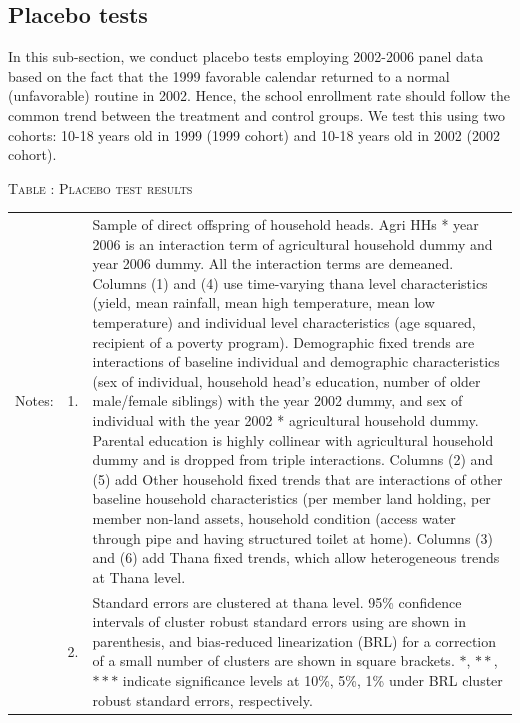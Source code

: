\documentclass[12pt,letterpaper]{article}
\newcommand{\0}{\ensuremath{\mbox{\boldmath $0$}}}
\begin{document}
\subsection{Placebo tests}

In this sub-section, we conduct placebo tests employing 2002-2006 panel data based on the fact that the 1999 favorable calendar returned to a normal (unfavorable) routine in 2002. Hence, the school enrollment rate should follow the common trend between the treatment and control groups. We test this using two cohorts: 10-18 years old in 1999 (1999 cohort) and 10-18 years old in 2002 (2002 cohort).

\begin{table}
\hfil\textsc{\footnotesize Table \thetable: Placebo test results \label{Placebo10}}\\
\setlength{\tabcolsep}{1pt}
\renewcommand{\arraystretch}{.75}
\hfil
\renewcommand{\arraystretch}{1}
\hfil\begin{tabular}{>{\hfill\scriptsize}p{1cm}<{}>{\hfill\scriptsize}p{.25cm}<{}>{\scriptsize}p{.7\paperwidth}<{\hfill}}
Notes:& 1. & Sample of direct offspring of household heads. \textsf{Agri HHs * year 2006} is an interaction term of agricultural household dummy and year 2006 dummy. All the interaction terms are demeaned. Columns \textsf{(1) and (4)} use time-varying thana level characteristics (yield, mean rainfall, mean high temperature, mean low temperature) and individual level characteristics (age squared, recipient of a poverty program). \textsf{Demographic fixed trends} are interactions of baseline individual and demographic characteristics (sex of individual, household head's education, number of older male/female siblings) with the year 2002 dummy, and sex of individual with the year 2002 * agricultural household dummy. Parental education is highly collinear with agricultural household dummy and is dropped from triple interactions. Columns \textsf{(2) and (5)} add \textsf{Other household fixed trends} that are interactions of other baseline household characteristics (per member land holding, per member non-land assets, household condition (access water through pipe and having structured toilet at home). Columns \textsf{(3) and (6)} add \textsf{Thana fixed trends}, which allow heterogeneous trends at Thana level. \\[-1ex]
& 2. & Standard errors are clustered at thana level. 95\% confidence intervals of cluster robust standard errors using \cite{liang1986longitudinal} are shown in parenthesis, and bias-reduced linearization (BRL) for a correction of a small number of clusters are shown in square brackets. $*$, $**$, $***$ indicate significance levels at 10\%, 5\%, 1\% under BRL cluster robust standard errors, respectively.
\end{tabular}
\end{table}
\end{document}
